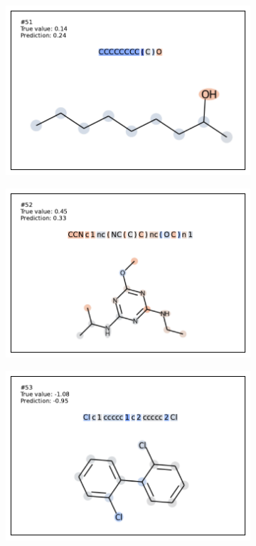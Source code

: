 \begin{figure}[h]
\begin{subfigure}[b]{0.33\textwidth}
\end{subfigure}
\begin{subfigure}[b]{0.33\textwidth} 
  \centering 
  \includegraphics[width=\textwidth]{figures/esol/esol51.pdf} 
\end{subfigure}\begin{subfigure}[b]{0.33\textwidth} 
  \centering 
  \includegraphics[width=\textwidth]{figures/esol/esol52.pdf} 
\end{subfigure}\begin{subfigure}[b]{0.33\textwidth} 
  \centering 
  \includegraphics[width=\textwidth]{figures/esol/esol53.pdf} 

\end{subfigure}
\end{figure}
